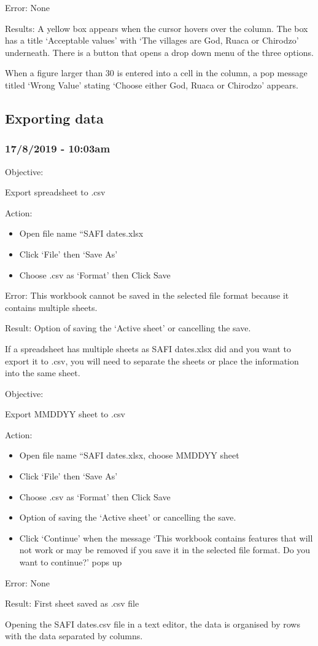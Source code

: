 \documentclass{article}
\begin{document}
Error: None\par
Results: A yellow box appears when the cursor hovers over the column. The box has a title ‘Acceptable values’ with ‘The villages are God, Ruaca or Chirodzo’ underneath. There is a button that opens a drop down menu of the three options.\par
When a figure larger than 30 is entered into a cell in the column, a pop message titled ‘Wrong Value’ stating ‘Choose either God, Ruaca or Chirodzo’ appears.
\subsection{Exporting data}\label{sec: CSVexport}
\subsubsection*{17/8/2019 - 10:03am}
Objective:\par
Export spreadsheet to .csv\par
Action:
\begin{itemize}
\item Open file name “SAFI dates.xlsx
\item Click ‘File’ then ‘Save As’
\item Choose .csv as ‘Format’ then Click Save
\end{itemize}
Error: This workbook cannot be saved in the selected file format because it contains multiple sheets.\par
Result: Option of saving the ‘Active sheet’ or cancelling the save.\par
If a spreadsheet has multiple sheets as SAFI dates.xlsx did and you want to export it to .csv, you will need to separate the sheets or place the information into the same sheet.\par
Objective:\par
Export MMDDYY sheet to .csv\par
Action:
\begin{itemize}
\item Open file name “SAFI dates.xlsx, choose MMDDYY sheet
\item Click ‘File’ then ‘Save As’
\item Choose .csv as ‘Format’ then Click Save
\item Option of saving the ‘Active sheet’ or cancelling the save.
\item Click ‘Continue’ when the message ‘This workbook contains features that will not work or may be removed if you save it in the selected file format. Do you want to continue?’ pops up
\end{itemize}
Error: None\par
Result: First sheet saved as .csv file\par
Opening the SAFI dates.csv file in a text editor, the data is organised by rows with the data separated by columns.
\end{document}
